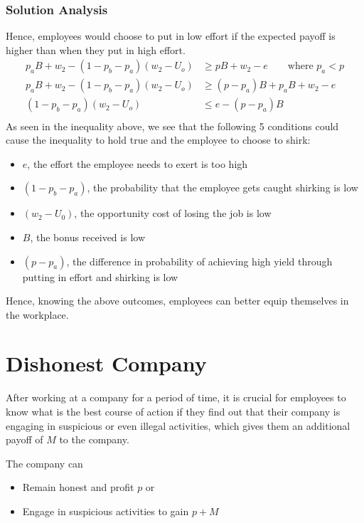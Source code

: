 \documentclass[a4paper, 12pt]{article}
\begin{document}
\subsubsection{Solution Analysis}
Hence, employees would choose to put in low effort if the expected payoff is higher than when they put in high effort.
\begin{align*}
    p_aB + w_2 - (1-p_b-p_a)(w_2-U_o) &\geq pB + w_2 - e \qquad \text{where $p_a < p$} \\
    p_aB + w_2 - (1-p_b-p_a)(w_2-U_o) &\geq (p - p_a)B + p_aB + w_2 - e \\
    (1-p_b-p_a)(w_2-U_o) &\leq e - (p - p_a)B\\
\end{align*}
As seen in the inequality above, we see that the following 5 conditions could cause the inequality to hold true and the employee to choose to shirk:
\begin{itemize}[noitemsep]
    \item $e$, the effort the employee needs to exert is too high
    \item $(1-p_b-p_a)$, the probability that the employee gets caught shirking is low
    \item $(w_2 - U_0)$, the opportunity cost of losing the job is low
    \item $B$, the bonus received is low
    \item $(p - p_a)$, the difference in probability of achieving high yield through putting in effort and shirking is low
\end{itemize}

Hence, knowing the above outcomes, employees can better equip themselves in the workplace.

\section{Dishonest Company}

After working at a company for a period of time, it is crucial for employees to know what is the best course of action if they find out that their company is engaging in suspicious or even illegal activities, which gives them an additional payoff of $M$ to the company. 

The company can
\begin{itemize}[noitemsep]
    \item Remain honest and profit $p$ or
    \item Engage in suspicious activities to gain $p + M$
\end{itemize}
\end{document}
